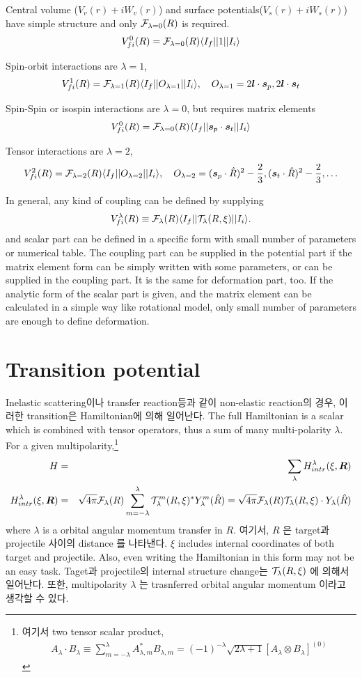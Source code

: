 \documentclass[11pt]{book}
\def\bm{\boldsymbol}
\def\vR{{\bm R}}
\def\la{\langle}
\def\ra{\rangle}
\newcommand{\bea}{\begin{eqnarray}}
\newcommand{\eea}{\end{eqnarray}}
\newcommand{\no}{\nonumber \\}
\begin{document}
Central volume ($V_v(r)+iW_v(r)$) and
surface potentials($V_s(r)+iW_s(r)$) have simple structure and only ${\cal F}_{\lambda=0}(R)$
is required.
\bea 
V^0_{fi}(R)={\cal F}_{\lambda=0}(R)\la I_f || 1 || I_i\ra 
\eea 

Spin-orbit interactions are $\lambda=1$,
\bea 
V^1_{fi}(R)={\cal F}_{\lambda=1}(R)\la I_f || O_{\lambda=1} || I_i\ra ,
   \quad O_{\lambda=1}=2{\bm l}\cdot {\bm s}_p,2{\bm l}\cdot {\bm s}_t
\eea 

Spin-Spin or isospin interactions are $\lambda=0$, but requires matrix elements
\bea 
V^{0}_{fi}(R)={\cal F}_{\lambda=0}(R)\la I_f || {\bm s}_p\cdot{\bm s}_t || I_i\ra 
\eea 

Tensor interactions are $\lambda=2$,
\bea 
V^{2}_{fi}(R)={\cal F}_{\lambda=2}(R)\la I_f || O_{\lambda=2} || I_i\ra ,
   \quad O_{\lambda=2}= ({\bm s}_p\cdot\hat{R})^2-\frac{2}{3},({\bm s}_t\cdot\hat{R})^2-\frac{2}{3},
                       \dots  
\eea 

In general, any kind of coupling can be defined by supplying 
\bea 
V^\lambda_{fi}(R)\equiv {\cal F}_\lambda(R)\la I_f || {\cal T}_{\lambda}(R,\xi)|| I_i\ra.
\eea 
and scalar part can be defined in a specific form with small number of parameters
or numerical table. The coupling part can be supplied in the potential part 
if the matrix element form can be simply written with some parameters, 
or can be supplied in the coupling part. It is the same for deformation part, too.
If the analytic form of the scalar part is given, and the matrix element can be calculated
in a simple way like rotational model, 
only small number of parameters are enough to define deformation. 

\section{Transition potential}
Inelastic scattering이나 transfer reaction등과 같이 non-elastic reaction의 경우,
이러한 transition은 Hamiltonian에 의해 일어난다. 
The full Hamiltonian is a scalar which is combined with tensor operators, 
thus a sum of many multi-polarity $\lambda$.
For a given multipolarity,\footnote{
여기서 two tensor scalar product,
\bea 
A_\lambda \cdot B_\lambda \equiv \sum_{m=-\lambda}^\lambda A_{\lambda,m}^* B_{\lambda,m}
       = (-1)^{-\lambda}\sqrt{2\lambda+1}\left[ A_\lambda\otimes B_\lambda \right]^{(0)}
\eea 
}
\bea 
H&=&\sum_{\lambda} H_{intr}^{\lambda}(\xi,\vR) \no 
H_{intr}^{\lambda}(\xi,\vR)&=&
\sqrt{4\pi} {\cal F}_\lambda(R)\sum_{m=-\lambda}^{\lambda}
  {\cal T}_{\lambda}^m(R, \xi)^* Y_{\lambda}^m(\hat{R})
  =\sqrt{4\pi}{\cal F}_\lambda(R) {\cal T}_{\lambda}(R,\xi)\cdot Y_\lambda(\hat{R})
\eea  
where $\lambda$ is a orbital angular momentum transfer in $R$.
여기서, $R$  은 target과 projectile 사이의 distance 를 나타낸다. 
$\xi$ includes internal coordinates
of both target and projectile. Also, even writing the Hamiltonian
in this form may not be an easy task. Taget과 projectile의 internal structure 
change는 ${\cal T}_{\lambda}(R,\xi)$ 에 의해서 일어난다.  또한, multipolarity $\lambda$
는 trasnferred orbital angular momentum 이라고 생각할 수 있다. 
\end{document}
